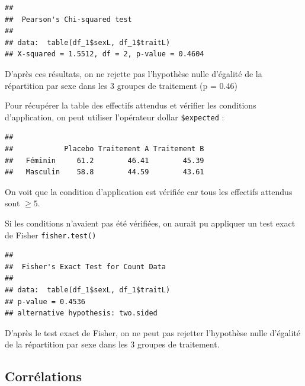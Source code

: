 \documentclass[
]{book}
\newenvironment{Shaded}{\begin{snugshade}}{\end{snugshade}}
\newcommand{\FunctionTok}[1]{\textcolor[rgb]{0.13,0.29,0.53}{\textbf{#1}}}
\newcommand{\NormalTok}[1]{#1}
\newcommand{\SpecialCharTok}[1]{\textcolor[rgb]{0.81,0.36,0.00}{\textbf{#1}}}
\begin{document}
\begin{verbatim}
## 
##  Pearson's Chi-squared test
## 
## data:  table(df_1$sexL, df_1$traitL)
## X-squared = 1.5512, df = 2, p-value = 0.4604
\end{verbatim}

D'après ces résultats, on ne rejette pas l'hypothèse nulle d'égalité de la répartition par sexe dans les 3 groupes de traitement (p = 0.46)

Pour récupérer la table des effectifs attendus et vérifier les conditions d'application, on peut utiliser l'opérateur dollar \texttt{\$expected} :

\begin{Shaded}
\end{Shaded}

\begin{verbatim}
##           
##            Placebo Traitement A Traitement B
##   Féminin     61.2        46.41        45.39
##   Masculin    58.8        44.59        43.61
\end{verbatim}

On voit que la condition d'application est vérifiée car tous les effectifs attendus sont \(\geq 5\).

Si les conditions n'avaient pas été vérifiées, on aurait pu appliquer un test exact de Fisher \texttt{fisher.test()}

\begin{Shaded}
\end{Shaded}

\begin{verbatim}
## 
##  Fisher's Exact Test for Count Data
## 
## data:  table(df_1$sexL, df_1$traitL)
## p-value = 0.4536
## alternative hypothesis: two.sided
\end{verbatim}

D'après le test exact de Fisher, on ne peut pas rejetter l'hypothèse nulle d'égalité de la répartition par sexe dans les 3 groupes de traitement.

\subsection{Corrélations}\label{corruxe9lations}
\end{document}
